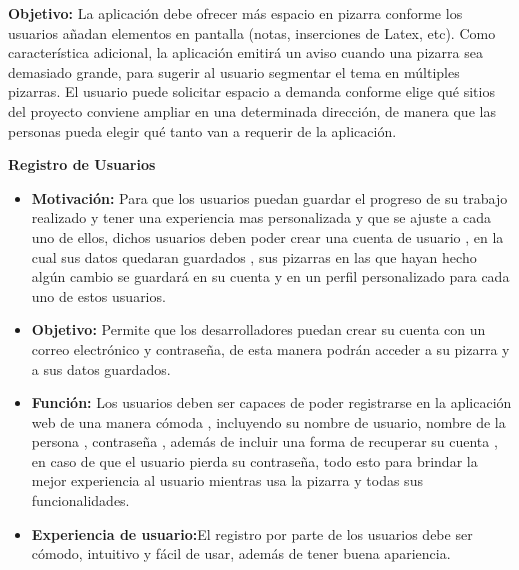 \documentclass[a4paper, oneside, final]{scrartcl}
\begin{document}
  \textbf{Objetivo:} La aplicación debe ofrecer más espacio en pizarra conforme los usuarios añadan elementos en pantalla (notas, inserciones de Latex, etc). Como característica adicional, la aplicación emitirá un aviso cuando una pizarra sea demasiado grande, para sugerir al usuario segmentar el tema en múltiples pizarras. El usuario puede solicitar espacio a demanda conforme elige qué sitios del proyecto conviene ampliar en una determinada dirección, de manera que las personas pueda elegir qué tanto van a requerir de la aplicación.


\noindent
\textbf{\large Registro de Usuarios} %
\begin{itemize}
    \item \textbf{Motivación:} Para que los usuarios puedan guardar el progreso de su trabajo realizado y tener una experiencia mas personalizada y que se ajuste a cada uno de ellos, dichos usuarios deben poder crear una cuenta de usuario , en la cual sus datos quedaran guardados , sus pizarras en las que hayan hecho algún cambio se guardará en su cuenta y en un perfil personalizado para cada uno de estos usuarios.
    \item \textbf{Objetivo:} Permite que los desarrolladores puedan crear su cuenta con un correo electrónico y contraseña, de esta manera podrán acceder a su pizarra y a sus datos guardados. 
    \item \textbf{Función:} Los usuarios deben ser capaces de poder registrarse en la aplicación web de una manera cómoda , incluyendo su nombre de usuario, nombre de la persona , contraseña , además de incluir una forma de recuperar su cuenta , en caso de que el usuario pierda su contraseña, todo esto para brindar la mejor experiencia al usuario mientras usa la pizarra y todas sus funcionalidades.

    \item \textbf{Experiencia de usuario:}El registro por parte de los usuarios debe ser cómodo, intuitivo y fácil de usar, además de tener buena apariencia.
\end{itemize}
\end{document}
